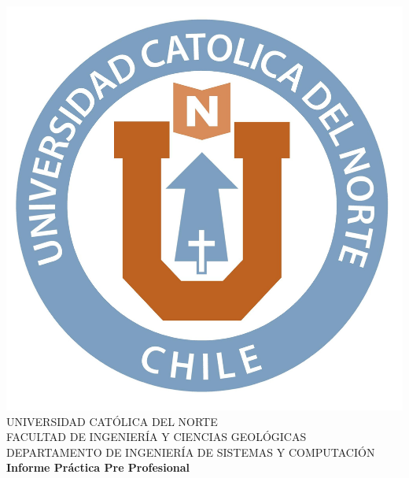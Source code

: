 \documentclass[oneside,12pt, letterpaper, titlepage]{book}
\begin{document}
\sloppy %
\renewcommand{\tablename}{Tabla}
\renewcommand{\listtablename}{Índice de Tablas}
\renewcommand{\listfigurename}{Índice de Figuras}
\setlength{\parindent}{0pt}

\onehalfspace

\begin{titlepage}
\centering
\vspace*{-0.4in}
\includegraphics[scale=0.3]{./images/u.jpg}\\
{\fontsize{14}{14}\selectfont
UNIVERSIDAD CATÓLICA DEL NORTE\\
FACULTAD DE INGENIERÍA Y CIENCIAS GEOLÓGICAS\\
DEPARTAMENTO DE INGENIERÍA DE SISTEMAS Y COMPUTACIÓN\\}
\vspace{2.3in}
{\fontsize{14}{14}\bfseries Informe Práctica Pre Profesional\\}
\vspace*{1.5in}

\end{titlepage}
\end{document}

